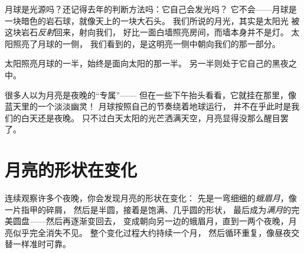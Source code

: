 \begin{example}[月光是反射的太阳光]\label{ex:g2:moon-in-the-sky:borrowed}
月球是光源吗？还记得去年的判断方法吗：它自己会发光吗？
它不会——月球是一块暗色的岩石球，就像天上的一块大石头。
我们所说的月光，其实是太阳光
被这块岩石\emph{反射}回来，射向我们，
好比一面白墙照亮房间，而墙本身并不是灯。
太阳照亮了月球的一侧，
我们看到的，是这明亮一侧中朝向我们的那一部分。
\end{example}

\begin{omfigure}

{\small 太阳照亮月球的一半，始终是面向太阳的那一半。
另一半则处于它自己的黑夜之中。}
\end{omfigure}

\begin{remark}[白天的月亮]\label{rem:g2:moon-in-the-sky:daytime}
很多人以为月亮是夜晚的“专属”——
但在一些下午抬头看看，它就挂在那里，像蓝天里的一个淡淡幽灵！
月球按照自己的节奏绕着地球运行，
并不在乎此时是我们的白天还是夜晚。
只不过白天太阳的光芒洒满天空，月亮显得没那么醒目罢了。
\end{remark}

\section{月亮的形状在变化}

\begin{example}[月亮的形状变化]\label{ex:g2:moon-in-the-sky:shapes}
连续观察许多个夜晚，你会发现月亮的形状在变化：
先是一弯细细的\emph{蛾眉月}，像一片指甲的碎屑，
然后是半圆，接着是饱满、几乎圆的形状，
最后成为\emph{满月}的完美圆盘——然后再逐渐变回去，
变成朝向另一边的蛾眉月，直到一两个夜晚，月亮似乎完全消失不见。
整个变化过程大约持续一个月，
然后循环重复，像昼夜交替一样准时可靠。
\end{example}


